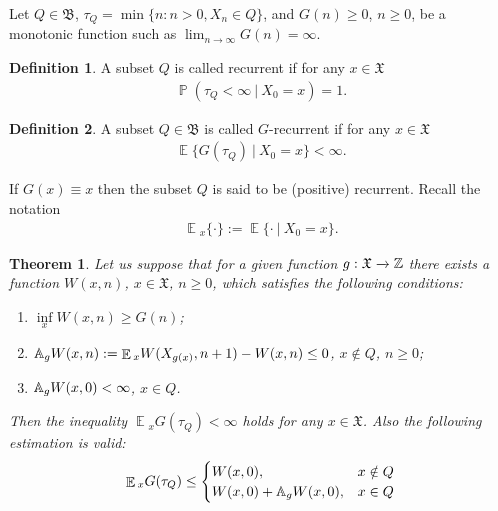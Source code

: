 \documentclass[10pt, reqno]{amsart}
\newtheorem{repeated_theorem}{Theorem}
\theoremstyle{definition}
\newtheorem{definition}{Definition}[section]
\newcommand{\aasVar}{Q} %
\newcommand{\asaVar}{\mathfrak{B}} %
\newcommand{\astVar}{\tau} %
\newcommand{\gtfVar}{G} %
\newcommand{\wtfVar}{W} %
\newcommand{\atoVar}{\mathbb{A}} %
\newcommand{\assVar}{\mathfrak{X}} %
\newcommand{\integers}{\mathbb{Z}} %
\DeclareMathOperator*{\E}{\mathbb{E}}
\DeclareMathOperator*{\Pb}{\mathbb{P}}
\begin{document}
	Let $\aasVar \in \asaVar$, $\astVar_{\aasVar} = \min\{n : n > 0, X_{n} \in \aasVar\}$, and $\gtfVar(n) \geq 0$, $n \geq 0$, be a monotonic function such as $\lim_{n \xrightarrow{} \infty}\gtfVar(n) = \infty$.
	\begin{definition}
		A subset $\aasVar$ is called recurrent if for any $x \in \assVar$
		\begin{gather*}
			\Pb(\astVar_{\aasVar} < \infty \: | \: X_{0} = x) = 1.
		\end{gather*}
	\end{definition}
	\begin{definition}
		A subset $\aasVar \in \asaVar$ is called $\gtfVar$-recurrent if for any $x \in \assVar$
		\begin{gather}
			\E\{\gtfVar(\astVar_{\aasVar}) \: | \: X_{0} = x\} < \infty.
		\end{gather}
	\end{definition}
	If $\gtfVar(x) \equiv x$ then the subset $\aasVar$ is said to be (positive) recurrent. Recall the notation
	\begin{gather}
		\E{}_{x}\{\cdot\} := \E\{\cdot \: | \: X_{0} = x\}.
	\end{gather}
	\begin{repeated_theorem}
		Let us suppose that for a given function $\gffVar:\assVar \xrightarrow{} \integers$ there exists a function $\wtfVar(x, n)$, $x \in \assVar$, $n \geq 0$, which satisfies the following conditions:
		\begin{enumerate}
			\item[(a)] $\underset{x}{\inf}\wtfVar(x, n) \geq \gtfVar(n)$;
			\item[(b)] $\atoVar_{\gffVar}\wtfVar(x, n) := \E{}_{x}\wtfVar(X_{\gffVar(x)}, n+1) - \wtfVar(x, n) \leq 0$, $x \notin \aasVar$, $n \geq 0$;
			\item[(c)] $\atoVar_{\gffVar}\wtfVar(x, 0) < \infty$, $x \in \aasVar$.
		\end{enumerate}
		Then the inequality $\E{}_{x}\gtfVar(\astVar_{\aasVar}) < \infty$ holds for any $x \in \assVar$. Also the following estimation is valid:
		\begin{gather}
			\E{}_{x}\gtfVar(\astVar_{\aasVar}) \leq \begin{cases}
				\wtfVar(x, 0), & x \notin \aasVar \\
				\wtfVar(x, 0) + \atoVar_{\gffVar}\wtfVar(x, 0), & x \in \aasVar
			\end{cases}
			\label{main_G_W_inequality}
		\end{gather}
	\end{repeated_theorem}
\end{document}
